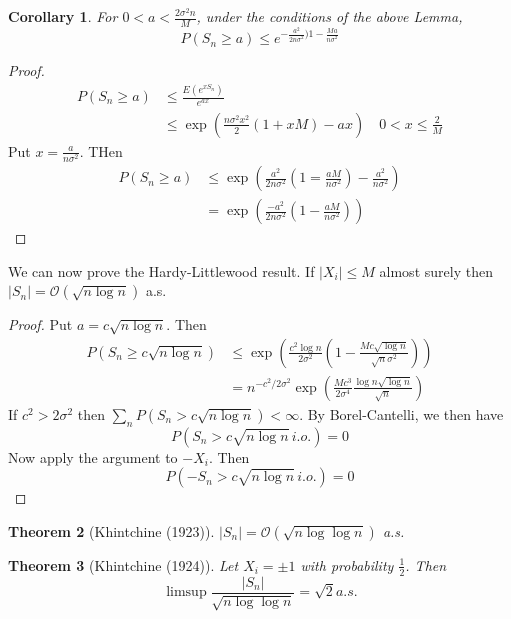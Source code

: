\documentclass[10pt, oneside, reqno]{amsart}
\theoremstyle{plain}%
\newtheorem{thm}{Theorem}[section]
\newtheorem{cor}[thm]{Corollary}
\theoremstyle{definition}
\theoremstyle{remark}
\begin{document}
\begin{cor}
    For $0 < a < \frac{2\sigma^2 n }{M}$, under the conditions of the above Lemma, \[
        P(S_n \geq a) \leq e^{-\frac{a^2}{2n\sigma^2})1 - \frac{Ma}{n\sigma^2}}
    \]
\end{cor}
\begin{proof}
    \begin{align*}
        P(S_n \geq a) &\leq \frac{E(e^{xS_n})}{e^{ax}} \\
                    &\leq \exp( \frac{n \sigma^2 x^2}{2}(1 + xM) - ax) \quad 0 < x \leq \frac{2}{M}
    \end{align*} Put $x = \frac{a}{n \sigma^2}$.  THen 
    \begin{align*}
        P(S_n \geq a) &\leq \exp( \frac{a^2}{2 n \sigma^2}(1 = \frac{aM}{n \sigma^2}) - \frac{a^2}{n \sigma^2}) \\
        &= \exp( \frac{-a^2}{2n \sigma^2}(1 - \frac{aM}{n \sigma^2})) 
    \end{align*}
\end{proof}

We can now prove the Hardy-Littlewood result.  
If $|X_i| \leq M$ almost surely then $|S_n| = \mathcal{O}(\sqrt{n \log n})$ a.s.
\begin{proof}
    Put $a = c \sqrt{ n \log n}$.  Then 
    \begin{align*}
        P(S_n \geq c \sqrt{n \log n}) &\leq \exp( \frac{c^2 \log n}{2 \sigma^2}( 1 - \frac{Mc \sqrt{\log n}}{\sqrt{n} \sigma^2})) \\
        &= n^{-c^2/2\sigma^2} \exp( \frac{Mc^3}{2\sigma^4} \frac{\log n \sqrt{\log n}}{\sqrt{n}}) 
    \end{align*}
    If $c^2 > 2 \sigma^2$ then $\sum_{n} P(S_n > c \sqrt{n \log n}) < \infty$.  By Borel-Cantelli, we then have \[
        P(S_n > c \sqrt{n \log n} \, i.o.) = 0
    \] Now apply the argument to $-X_i$.  Then \[
        P(-S_n > c \sqrt{n \log n} \, i.o.) = 0
    \]
\end{proof}

\begin{thm}[Khintchine (1923)] $|S_n | = \mathcal{O}(\sqrt{ n \log \log n})$ a.s.
\end{thm}
\begin{thm}[Khintchine (1924)]Let $X_i = \pm 1$ with probability $\frac{1}{2}$.  Then \[
    \limsup \frac{|S_n|}{\sqrt{n \log \log n}} = \sqrt{2} a.s.
\]
\end{thm}


\end{document}
